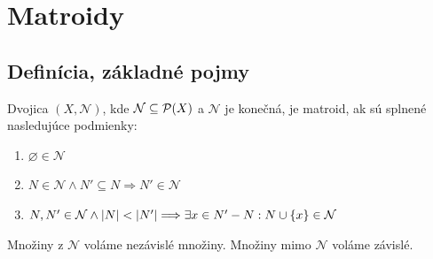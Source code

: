 \chapter{Matroidy}

\section{Definícia, základné pojmy}

\begin{definition}
\label{def:matroid}
Dvojica $(X, \mathcal{N})$, kde $\mathcal{N} \subseteq \mathcal{P}(X)$ a $\mathcal{N}$ je konečná, je matroid, ak sú splnené nasledujúce podmienky:
\begin{enumerate}
    \item $\varnothing \in \mathcal{N}$
    \item $N \in \mathcal{N} \wedge N' \subseteq N \Longrightarrow N' \in \mathcal{N}$
    \item $N, N' \in \mathcal{N} \wedge \left|N\right| < \left|N'\right| \Longrightarrow \exists x \in N' - N: N \cup \left\{x\right\} \in \mathcal{N}$
\end{enumerate}

Množiny z $\mathcal{N}$ voláme nezávislé množiny. Množiny mimo $\mathcal{N}$ voláme závislé.
\end{definition}

